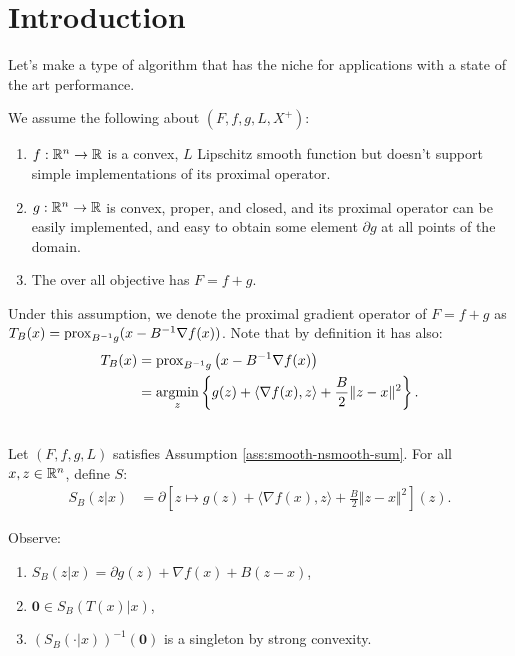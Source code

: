 \documentclass[12pt]{article}
\begin{document}
\section{Introduction}
    Let's make a type of algorithm that has the niche for applications with a state of the art performance. 
    \begin{assumption}\label{ass:smooth-nsmooth-sum}
        We assume the following about $(F, f, g, L, X^+)$: 
        \begin{enumerate}[nosep]
            \item $f: \mathbb R^n \rightarrow \mathbb R$ is a convex, $L$ Lipschitz smooth function but doesn't support simple implementations of its proximal operator. 
            \item $g: \mathbb R^n \rightarrow \mathbb R$ is convex, proper, and closed, and its proximal operator can be easily implemented, and easy to obtain some element $\partial g$ at all points of the domain. 
            \item The over all objective has $F = f + g$. 
        \end{enumerate}
        Under this assumption, we denote the proximal gradient operator of $F = f+ g$ as $T_B(x) = \operatorname{prox}_{B^{-1}g}(x - B^{-1}\nabla f(x))$. 
        Note that by definition it has also:
        \begin{align*}
            T_B(x) &= 
            \operatorname{prox}_{B^{-1}g}\left(
                x - B^{-1}\nabla f(x)
            \right)
            \\
            &= \mathop{\rm argmin}\limits_{z}\left\lbrace
                g(z)
                + \langle \nabla f(x), z\rangle
                + \frac{B}{2}\Vert z - x \Vert^2
            \right\rbrace. 
        \end{align*}
    \end{assumption}
    \begin{definition}\;\\
        Let $(F, f, g, L)$ satisfies Assumption \ref{ass:smooth-nsmooth-sum}. 
        For all $x, z \in \mathbb R^n$, define $S$: 
        \begin{align*}
            S_B(z | x) &= \partial 
            \left[
                z \mapsto g(z)
                + \langle \nabla f(x), z\rangle
                + \frac{B}{2}\Vert z - x \Vert^2
            \right](z). 
        \end{align*}
    \end{definition}
    Observe: 
    \begin{enumerate}[nosep]
        \item $S_B(z | x) = \partial g(z) + \nabla f(x)+ B(z - x)$,
        \item $\mathbf 0 \in S_B(T(x) | x)$, 
        \item $(S_B(\cdot | x))^{-1}(\mathbf 0)$ is a singleton by strong convexity. 
    \end{enumerate}
\end{document}
